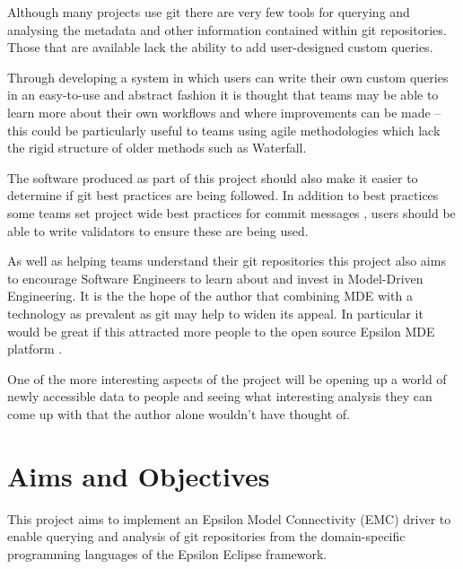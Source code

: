 \documentclass[11pt]{book}
\begin{document}
Although many projects use git there are very few tools for querying and analysing the metadata and other information contained within git repositories. Those that are available lack the ability to add user-designed custom queries. 

Through developing a system in which users can write their own custom queries in an easy-to-use and abstract fashion it is thought that teams may be able to learn more about their own workflows and where improvements can be made -- this could be particularly useful to teams using agile methodologies which lack the rigid structure of older methods such as Waterfall.

The software produced as part of this project should also make it easier to determine if git best practices \cite{gitbestpractices} are being followed. In addition to best practices some teams set project wide best practices for commit messages \cite{erlanggitcommitmessages}, users should be able to write validators to ensure these are being used.

As well as helping teams understand their git repositories this project also aims to encourage Software Engineers to learn about and invest in Model-Driven Engineering. It is the the hope of the author that combining MDE with a technology as prevalent as git may help to widen its appeal. In particular it would be great if this attracted more people to the open source Epsilon MDE platform \cite{epsilonhomepage}.

One of the more interesting aspects of the project will be opening up a world of newly accessible data to people and seeing what interesting analysis they can come up with that the author alone wouldn't have thought of.

\section{Aims and Objectives}
\label{aimsandobjectives} 
This project aims to implement an Epsilon Model Connectivity (EMC) driver to enable querying and analysis of git repositories from the domain-specific programming languages of the Epsilon Eclipse framework.
\end{document}
